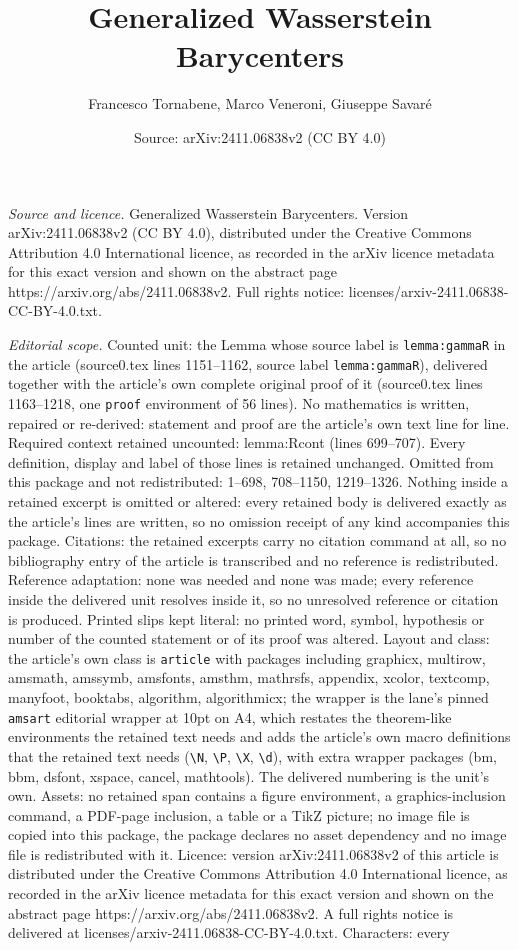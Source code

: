 \documentclass[10pt,a4paper]{amsart}
\title[Generalized Wasserstein Barycenters]{Generalized Wasserstein Barycenters}
\author{Francesco Tornabene, Marco Veneroni, Giuseppe Savar\'e}
\date{Source: arXiv:2411.06838v2 (CC BY 4.0)}
\begin{document}
\maketitle

\noindent\emph{Source and licence.} Generalized Wasserstein Barycenters. Version arXiv:2411.06838v2 (CC BY 4.0), distributed under the Creative Commons Attribution 4.0 International licence, as recorded in the arXiv licence metadata for this exact version and shown on the abstract page https://arxiv.org/abs/2411.06838v2. Full rights notice: licenses/arxiv-2411.06838-CC-BY-4.0.txt.\par\smallskip

\noindent\textit{Editorial scope.} Counted unit: the Lemma whose source label is \texttt{lemma:gammaR} in the article (source0.tex lines 1151--1162, source label \texttt{lemma:gammaR}), delivered together with the article's own complete original proof of it (source0.tex lines 1163--1218, one \texttt{proof} environment of 56 lines). No mathematics is written, repaired or re-derived: statement and proof are the article's own text line for line. Required context retained uncounted: lemma:Rcont (lines 699--707). Every definition, display and label of those lines is retained unchanged. Omitted from this package and not redistributed: 1--698, 708--1150, 1219--1326. Nothing inside a retained excerpt is omitted or altered: every retained body is delivered exactly as the article's lines are written, so no omission receipt of any kind accompanies this package. Citations: the retained excerpts carry no citation command at all, so no bibliography entry of the article is transcribed and no reference is redistributed. Reference adaptation: none was needed and none was made; every reference inside the delivered unit resolves inside it, so no unresolved reference or citation is produced. Printed slips kept literal: no printed word, symbol, hypothesis or number of the counted statement or of its proof was altered. Layout and class: the article's own class is \texttt{article} with packages including graphicx, multirow, amsmath, amssymb, amsfonts, amsthm, mathrsfs, appendix, xcolor, textcomp, manyfoot, booktabs, algorithm, algorithmicx; the wrapper is the lane's pinned \texttt{amsart} editorial wrapper at 10pt on A4, which restates the theorem-like environments the retained text needs and adds the article's own macro definitions that the retained text needs (\texttt{\textbackslash N}, \texttt{\textbackslash P}, \texttt{\textbackslash X}, \texttt{\textbackslash d}), with extra wrapper packages (bm, bbm, dsfont, xspace, cancel, mathtools). The delivered numbering is the unit's own. Assets: no retained span contains a figure environment, a graphics-inclusion command, a PDF-page inclusion, a table or a TikZ picture; no image file is copied into this package, the package declares no asset dependency and no image file is redistributed with it. Licence: version arXiv:2411.06838v2 of this article is distributed under the Creative Commons Attribution 4.0 International licence, as recorded in the arXiv licence metadata for this exact version and shown on the abstract page https://arxiv.org/abs/2411.06838v2. A full rights notice is delivered at licenses/arxiv-2411.06838-CC-BY-4.0.txt. Characters: every 
\end{document}
